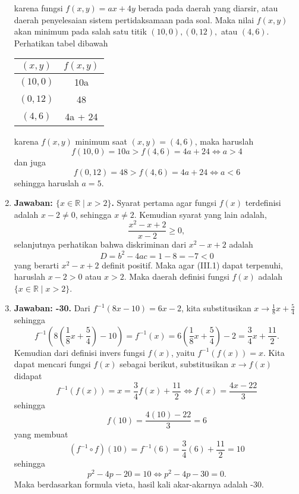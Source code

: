 \begin{enumerate}
\begin{figure}[H]
	\end{figure}
karena fungsi $f(x,y) = ax + 4y$ berada pada daerah yang diarsir, atau daerah penyelesaian sistem pertidaksamaan pada soal. Maka nilai $f(x,y)$ akan minimum pada salah satu titik $(10,0), (0,12),$ atau $(4,6)$. Perhatikan tabel dibawah
	\begin{center}
		\begin{tabular}{|c|c|}
		\hline
		$(x,y)$ & $f(x,y)$\\
		\hline
		$(10,0)$ & 10a\\
		\hline
		$(0,12)$ & 48\\
		\hline
		$(4,6)$ & 4a + 24\\
		\hline 
		\end{tabular}
	\end{center}
karena $f(x,y)$ minimum saat $(x,y) = (4,6)$, maka haruslah $$f(10,0) = 10a > f(4,6) = 4a + 24\Leftrightarrow a > 4$$ dan juga $$f(0,12) = 48 > f(4,6) = 4a + 24\Leftrightarrow a < 6$$sehingga haruslah $a=5$.

\item \textbf{Jawaban: $\{x\in\mathbb{R}\mid x>2\}$.} Syarat pertama agar fungsi $f(x)$ terdefinisi adalah $x-2 \neq 0$, sehingga $x\neq 2$. Kemudian syarat yang lain adalah, \setcounter{equation}{0}\begin{equation}\frac{x^2-x+2}{x-2} \geq 0,\end{equation}selanjutnya perhatikan bahwa diskriminan dari $x^2-x+2$ adalah $$D = b^2-4ac = 1 - 8 = -7 < 0$$yang berarti $x^2-x+2$ definit positif. Maka agar (III.1) dapat terpenuhi, haruslah $x-2 > 0$ atau $x>2$. Maka daerah definisi fungsi $f(x)$ adalah $\{x\in\mathbb{R}\mid x>2\}$.

\item \textbf{Jawaban: -30.} Dari $f^{-1}(8x-10) = 6x - 2$, kita substitusikan $x\rightarrow \frac{1}{8}x + \frac{5}{4}$ sehingga \setcounter{equation}{0}\begin{equation}f^{-1}\left(8\left(\frac{1}{8}x + \frac{5}{4}\right)-10\right) = f^{-1}(x) = 6\left(\frac{1}{8}x + \frac{5}{4}\right)-2 = \frac{3}{4}x + \frac{11}{2}.\end{equation}Kemudian dari definisi invers fungsi $f(x)$, yaitu $f^{-1}(f(x)) = x$. Kita dapat mencari fungsi $f(x)$ sebagai berikut, substitusikan $x\rightarrow f(x)$ didapat $$f^{-1}(f(x)) = x = \frac{3}{4}f(x) + \frac{11}{2}\Leftrightarrow f(x) = \frac{4x-22}{3}$$sehingga $$f(10) = \frac{4(10)-22}{3} = 6$$yang membuat $$(f^{-1}\circ f)(10) = f^{-1}(6) = \frac{3}{4}(6) + \frac{11}{2} = 10$$sehingga $$p^2-4p-20 = 10\Leftrightarrow p^2-4p-30 = 0.$$Maka berdasarkan formula vieta, hasil kali akar-akarnya adalah -30.


\end{enumerate}
